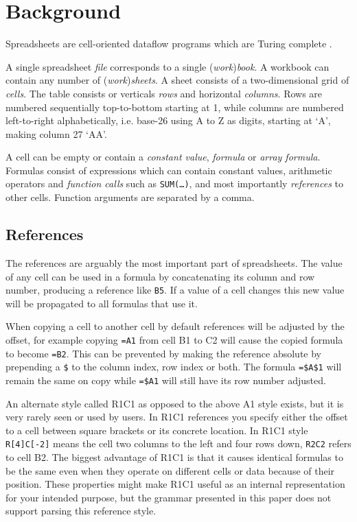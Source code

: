\documentclass[conference]{IEEEtran}
\begin{document}
\section{Background}

Spreadsheets are cell-oriented dataflow programs which are Turing complete \cite{ExcelTuringComplete}.

A single spreadsheet \emph{file} corresponds to a single (\emph{work})\emph{book}.
A workbook can contain any number of (\emph{work})\emph{sheets}.
A sheet consists of a two-dimensional grid of \emph{cells}.
The table consists or verticals \emph{rows} and horizontal \emph{columns}.
Rows are numbered sequentially top-to-bottom starting at 1, while columns are numbered left-to-right alphabetically, i.e. base-26 using A to Z as digits, starting at `A', making column 27 `AA'.

A cell can be empty or contain a \emph{constant value}, \emph{formula} or \emph{array formula}.
Formulas consist of expressions which can contain constant values, arithmetic operators and \emph{function calls} such as \texttt{SUM(\ldots)}, and most importantly \emph{references} to other cells.
Function arguments are separated by a comma.

\subsection{References}
The references are arguably the most important part of spreadsheets.
The value of any cell can be used in a formula by concatenating its column and row number, producing a reference like \texttt{B5}.
If a value of a cell changes this new value will be propagated to all formulas that use it.

When copying a cell to another cell by default references will be adjusted by the offset, for example copying \texttt{=A1} from cell B1 to C2 will cause the copied formula to become \texttt{=B2}.
This can be prevented by making the reference absolute by prepending a \texttt{\$} to the column index, row index or both.
The formula \texttt{=\$A\$1} will remain the same on copy while \texttt{=\$A1} will still have its row number adjusted.

An alternate style called R1C1 as opposed to the above A1 style exists, but it is very rarely seen or used by users.
In R1C1 references you specify either the offset to a cell between square brackets or its concrete location.
In R1C1 style \texttt{R[4]C[-2]} means the cell two columns to the left and four rows down, \texttt{R2C2} refers to cell B2.
The biggest advantage of R1C1 is that it causes identical formulas to be the same even when they operate on different cells or data because of their position.
These properties might make R1C1 useful as an internal representation for your intended purpose, but the grammar presented in this paper does not support parsing this reference style.
\end{document}
